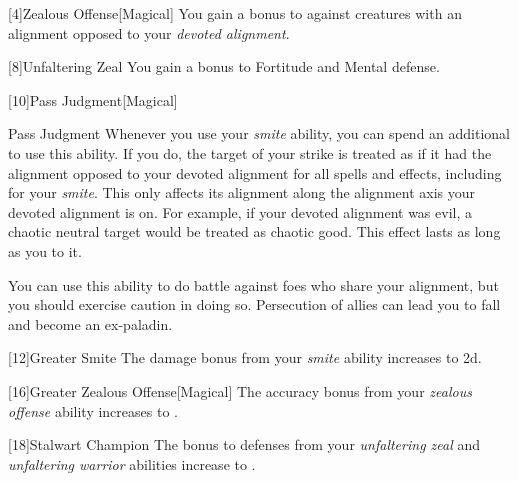         [4]{Zealous Offense}[Magical]
        You gain a  bonus to  against creatures with an alignment opposed to your \textit{devoted alignment}.

        [8]{Unfaltering Zeal}
        You gain a  bonus to Fortitude and Mental defense.

        [10]{Pass Judgment}[Magical]
        \begin{ability}{Pass Judgment}
            Whenever you use your \textit{smite} ability, you can spend an additional  to use this ability.
            If you do, the target of your strike is treated as if it had the alignment opposed to your devoted alignment for all spells and effects, including for your \textit{smite}.
            This only affects its alignment along the alignment axis your devoted alignment is on.
            For example, if your devoted alignment was evil, a chaotic neutral target would be treated as chaotic good.
            This effect lasts as long as you  to it.

            You can use this ability to do battle against foes who share your alignment, but you should exercise caution in doing so.
            Persecution of allies can lead you to fall and become an ex-paladin.
        \end{ability}

        [12]{Greater Smite} The damage bonus from your \textit{smite} ability increases to \plus2d.

        [16]{Greater Zealous Offense}[Magical]
        The accuracy bonus from your \textit{zealous offense} ability increases to .

        [18]{Stalwart Champion}
        The bonus to defenses from your \textit{unfaltering zeal} and \textit{unfaltering warrior} abilities increase to .


